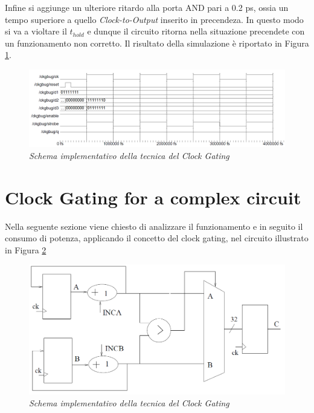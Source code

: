 \noindent Infine si aggiunge un ulteriore ritardo alla porta AND pari a 0.2 ps, ossia un tempo superiore a quello \textit{Clock-to-Output} inserito in precendeza. In questo modo si va a violtare il $t_{hold}$ e dunque il circuito ritorna nella situazione precendete con un funzionamento non corretto. Il risultato della simulazione è riportato in Figura \ref{clock_gat3}. \\
\begin{figure}[!htb]
	\centering
	\includegraphics[scale=0.8]{immagini/clock_gating3}
	\caption{\textit{Schema implementativo della tecnica del Clock Gating}}
	\label{clock_gat3}
\end{figure}

\section{Clock Gating for a complex circuit}
Nella seguente sezione viene chiesto di analizzare il funzionamento e in seguito il consumo di potenza, applicando il concetto del clock gating, nel circuito illustrato in Figura \ref{circuito_3_2}
\begin{figure}[!htb]
	\centering
	\includegraphics[scale=0.8]{immagini/circuito_3_2}
	\caption{\textit{Schema implementativo della tecnica del Clock Gating}}
	\label{circuito_3_2}
\end{figure}
